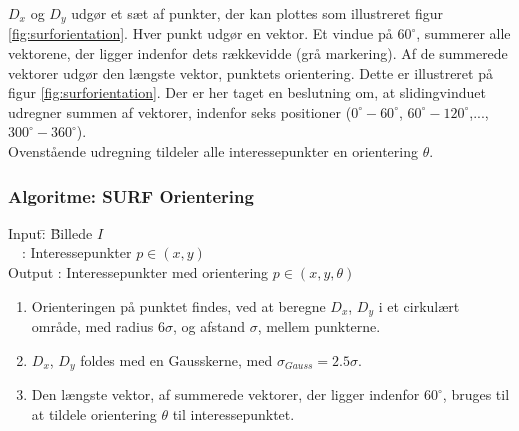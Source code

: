 $D_x$ og $D_y$ udgør et sæt af punkter, der kan plottes som illustreret figur \ref{fig:surforientation}. Hver punkt udgør en vektor. Et vindue på $60^{\circ}$, summerer alle vektorene, der ligger indenfor dets rækkevidde (grå markering). Af de summerede vektorer udgør den længste vektor, punktets orientering. Dette er illustreret på figur \ref{fig:surforientation}. Der er her taget en beslutning om, at slidingvinduet udregner summen af vektorer, indenfor seks positioner ($0^{\circ}-60^{\circ}$, $60^{\circ}-120^{\circ}$,..., $300^{\circ}-360^{\circ}$).
\\
Ovenstående udregning tildeler alle interessepunkter en orientering $\theta$.
\subsubsection*{Algoritme: SURF Orientering}
\begin{tabbing}
Input\quad \= : \= Billede $I$\\
$\text{ }$ \> : \>  Interessepunkter $p \in (x, y)$ \\
Output \text{ } \> : \> Interessepunkter med orientering $p \in (x, y, \theta)$
\end{tabbing}
\begin{enumerate}
\item Orienteringen på punktet findes, ved at beregne $D_x$, $D_y$ i et cirkulært område, med radius $6\sigma$, og afstand $\sigma$, mellem punkterne. 
\item $D_x$, $D_y$ foldes med en Gausskerne, med $\sigma_{Gauss} = 2.5\sigma $.
\item Den længste vektor, af summerede vektorer, der ligger indenfor $60^{\circ}$, bruges til at tildele orientering $\theta$ til interessepunktet.
\end{enumerate}